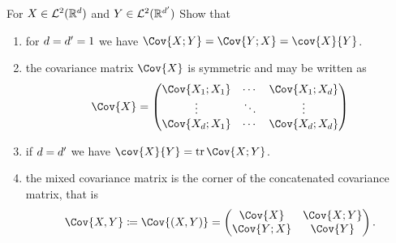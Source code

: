 \begin{exercise}[subtitle={Covariance matrices \Coffeecup}]
    \label{ex: covariance matrix}
    For \(X \in \mathcal{L}^2(\mathbb{R}^d)\) and \(Y \in \mathcal{L}^2(\mathbb{R}^{d'})\) Show
    that
    \begin{enumerate}[label=(\alph*), noitemsep]
        \item\label{it: (covariance matrix) in one dimension}
        for \(d = d'=1\) we have \(\Cov{X;Y} = \Cov{Y;X} = \cov{X}{Y}\).
        \item\label{it: (covariance matrix) representation}
        the covariance matrix \(\Cov{X}\) is symmetric and may be written as
        \[
            \Cov{X} 
            = \begin{pmatrix}
                \Cov{X_1;X_1} & \cdots & \Cov{X_1;X_d} \\
                \vdots & \ddots & \vdots \\
                \Cov{X_d;X_1} & \cdots & \Cov{X_d;X_d}
            \end{pmatrix}
        \]

        \item\label{it: (covariance matrix) vs covariance} if \(d = d'\) we have \(\cov{X}{Y} = \tr\Cov{X;Y}\).

        \item\label{it: (covariance matrix) mixed} the mixed covariance matrix is the corner of the concatenated
        covariance matrix, that is
        \[
            \Cov{X,Y} \coloneq \Cov{(X,Y)} = \begin{pmatrix}
                \Cov{X} & \Cov{X;Y} \\
                \Cov{Y;X} & \Cov{Y}
            \end{pmatrix}.
        \]
    \end{enumerate}
\end{exercise}

